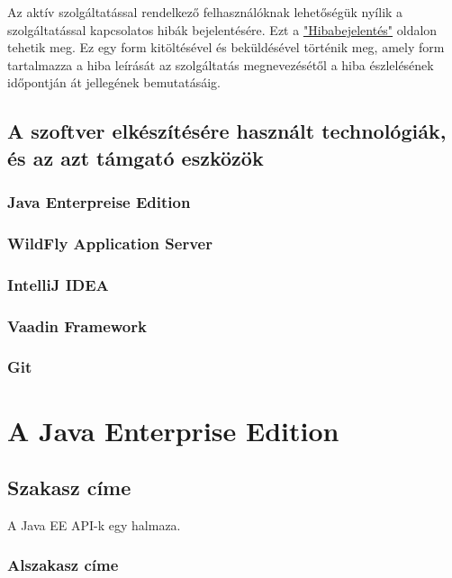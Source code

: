 \documentclass[centeredchapter]{thesis-ekf}
\theoremstyle{definition}
\theoremstyle{remark}
\begin{document}
Az aktív szolgáltatással rendelkező felhasználóknak lehetőségük nyílik a szolgáltatással kapcsolatos hibák bejelentésére. Ezt a \hyperlink{leiras-bejelentes}{"Hibabejelentés"} oldalon tehetik meg.
Ez egy form kitöltésével és beküldésével történik meg, amely form tartalmazza a hiba leírását az szolgáltatás megnevezésétől a hiba észlelésének időpontján át jellegének bemutatásáig.

\section{A szoftver elkészítésére használt technológiák, és az azt támgató eszközök}

\subsection{Java Enterpreise Edition}

\subsection{WildFly Application Server}

\subsection{IntelliJ IDEA}

\subsection{Vaadin Framework}

\subsection{Git}

\chapter{A Java Enterprise Edition}

\section{Szakasz címe}

A Java EE API-k egy halmaza.

\subsection{Alszakasz címe}
\end{document}
